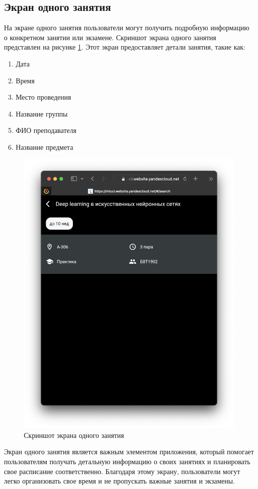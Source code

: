 \subsection{Экран одного занятия}
На экране одного занятия пользователи могут получить подробную информацию о конкретном занятии или экзамене.
Скриншот экрана одного занятия представлен на рисунке \ref{fig:app:lesson}.
Этот экран предоставляет детали занятия,
такие как:
\begin{enumerate}
    \item Дата
    \item Время
    \item Место проведения
    \item Название группы
    \item ФИО преподавателя
    \item Название предмета
\end{enumerate}

\begin{figure}
\centering
\includegraphics[width=0.8\linewidth]{images/app/lesson.png}
\caption{Скриншот экрана одного занятия}
\label{fig:app:lesson}
\end{figure}

Экран одного занятия является важным элементом приложения,
который помогает пользователям получать детальную информацию
о своих занятиях и планировать свое расписание соответственно.
Благодаря этому экрану, пользователи могут легко организовать
свое время и не пропускать важные занятия и экзамены.

